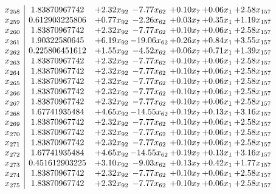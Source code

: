 \documentclass[8pt]{article}
\begin{document}
\[\begin{array}{c| c c@{\hskip 2pt} c@{\hskip 2pt} c@{\hskip 2pt} c@{\hskip 2pt} c@{\hskip 2pt} }
 x_{258}   &  1.83870967742 & +  2.32 x_{92} & -7.77 x_{62} & +  0.10 x_{7} & +  0.06 x_{1} & +  2.58 x_{157}\\
 x_{259}   &  0.612903225806 & +  0.77 x_{92} & -2.26 x_{62} & +  0.03 x_{7} & +  0.35 x_{1} & +  1.19 x_{157}\\
 x_{260}   &  1.83870967742 & +  2.32 x_{92} & -7.77 x_{62} & +  0.10 x_{7} & +  0.06 x_{1} & +  2.58 x_{157}\\
 x_{261}   &  1.90322580645 & +  6.19 x_{92} & -19.06 x_{62} & +  0.26 x_{7} & +  0.84 x_{1} & +  3.55 x_{157}\\
 x_{262}   &  0.225806451612 & +  1.55 x_{92} & -4.52 x_{62} & +  0.06 x_{7} & +  0.71 x_{1} & +  1.39 x_{157}\\
 x_{263}   &  1.83870967742 & +  2.32 x_{92} & -7.77 x_{62} & +  0.10 x_{7} & +  0.06 x_{1} & +  2.58 x_{157}\\
 x_{264}   &  1.83870967742 & +  2.32 x_{92} & -7.77 x_{62} & +  0.10 x_{7} & +  0.06 x_{1} & +  2.58 x_{157}\\
 x_{265}   &  1.83870967742 & +  2.32 x_{92} & -7.77 x_{62} & +  0.10 x_{7} & +  0.06 x_{1} & +  2.58 x_{157}\\
 x_{266}   &  1.83870967742 & +  2.32 x_{92} & -7.77 x_{62} & +  0.10 x_{7} & +  0.06 x_{1} & +  2.58 x_{157}\\
 x_{267}   &  1.83870967742 & +  2.32 x_{92} & -7.77 x_{62} & +  0.10 x_{7} & +  0.06 x_{1} & +  2.58 x_{157}\\
 x_{268}   &  1.67741935484 & +  4.65 x_{92} & -14.55 x_{62} & +  0.19 x_{7} & +  0.13 x_{1} & +  3.16 x_{157}\\
 x_{269}   &  1.83870967742 & +  2.32 x_{92} & -7.77 x_{62} & +  0.10 x_{7} & +  0.06 x_{1} & +  2.58 x_{157}\\
 x_{270}   &  1.83870967742 & +  2.32 x_{92} & -7.77 x_{62} & +  0.10 x_{7} & +  0.06 x_{1} & +  2.58 x_{157}\\
 x_{271}   &  1.83870967742 & +  2.32 x_{92} & -7.77 x_{62} & +  0.10 x_{7} & +  0.06 x_{1} & +  2.58 x_{157}\\
 x_{272}   &  1.67741935484 & +  4.65 x_{92} & -14.55 x_{62} & +  0.19 x_{7} & +  0.13 x_{1} & +  3.16 x_{157}\\
 x_{273}   &  0.451612903225 & +  3.10 x_{92} & -9.03 x_{62} & +  0.13 x_{7} & +  0.42 x_{1} & +  1.77 x_{157}\\
 x_{274}   &  1.83870967742 & +  2.32 x_{92} & -7.77 x_{62} & +  0.10 x_{7} & +  0.06 x_{1} & +  2.58 x_{157}\\
 x_{275}   &  1.83870967742 & +  2.32 x_{92} & -7.77 x_{62} & +  0.10 x_{7} & +  0.06 x_{1} & +  2.58 x_{157}\\

\end{array}\]
\end{document}
